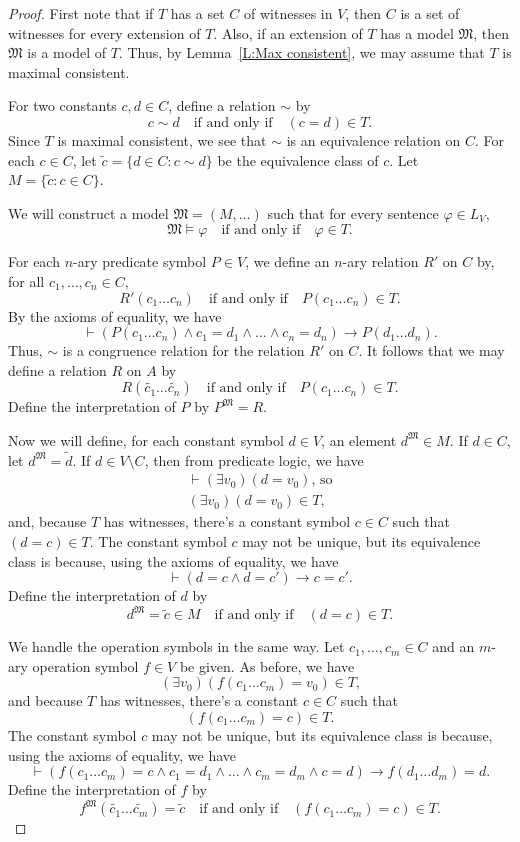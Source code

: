 \documentclass{scrartcl}
\renewcommand{\phi}{\varphi}
\newcommand{\FM}{\mathfrak{M}}
\begin{document}
\begin{proof}
First note that if $T$ has a set $C$ of witnesses in $V$, then $C$ is a set of witnesses for every extension of $T$. Also, if an extension of $T$ has a model $\FM$, then $\FM$ is a model of $T$. Thus, by Lemma~\ref{L:Max consistent}, we may assume that $T$ is maximal consistent.

For two constants $c,d\in C$, define a relation $\sim$ by 
\[
c\sim d \quad \text{if and only if} \quad (c=d)\in T\text{.}
\]
Since $T$ is maximal consistent, we see that $\sim$ is an equivalence relation on $C$. For each $c\in C$, let $\tilde{c} = \{ d\in C\colon c\sim d\}$ be the equivalence class of $c$. Let 
$M = \{\tilde{c}:c\in C\}$.

We will construct a model $\FM = (M,\dots)$ such that for every sentence $\phi\in L_V$, 
\[
\FM \models \phi \quad \text{if and only if} \quad \phi\in T\text{.}
\]

For each $n$-ary predicate symbol $P\in V$, we define an $n$-ary relation $R'$ on $C$ by, for all $c_1,\dots, c_n\in C$, 
\[
R'(c_1 \dots c_n)\quad \text{if and only if} \quad P(c_1\dots c_n)\in T\text{.}
\]
By the axioms of equality, we have 
\[
\vdash (P(c_1\dots c_n)\wedge c_1 = d_1 \wedge \dots \wedge c_n = d_n) \rightarrow P(d_1\dots d_n)\text{.}
\]
Thus, $\sim$ is a congruence relation for the relation $R'$ on $C$. It follows that we may define a relation $R$ on $A$ by 
\[
R(\tilde{c_1}\dots \tilde{c_n})\quad \text{if and only if}\quad P(c_1\dots c_n)\in T\text{.}
\]
Define the interpretation of $P$ by $P^\FM = R$.

Now we will define, for each constant symbol $d\in V$, an element $d^{\FM}\in M$. If $d\in C$, let $d^\FM = \tilde{d}$. If $d\in V\setminus C$, then from predicate logic, we have
\begin{align*}
\vdash (\exists v_0)(d=v_0)\text{, so}\\
(\exists v_0)(d=v_0)\in T\text{,}
\end{align*}
and, because $T$ has witnesses, there's a constant symbol $c\in C$ such that $(d=c)\in T$.
The constant symbol $c$ may not be unique, but its equivalence class is because, using the axioms of equality, we have 
\[
\vdash (d=c\wedge d=c')\rightarrow c=c'\text{.}
\]
Define the interpretation of $d$ by 
\[ d^\FM = \tilde{c}\in M\quad \text{if and only if}\quad(d=c)\in T \text{.}
\]

We handle the operation symbols in the same way. Let $c_1,\dots, c_m\in C$ and an $m$-ary operation symbol $f\in V$ be given. As before, we have \[
(\exists v_0)(f(c_1\dots c_m)=v_0)\in T\text{,}
\]
and because $T$ has witnesses, there's a constant $c\in C$ such that 
\[
(f(c_1\dots c_m) = c)\in T\text{.}
\]
The constant symbol $c$ may not be unique, but its equivalence class is because, using the axioms of equality, we have 
\[
\vdash (f(c_1\dots c_m) = c\wedge c_1 = d_1\wedge \dots \wedge c_m = d_m \wedge c=d)\rightarrow f(d_1\dots d_m) = d\text{.}
\]
Define the interpretation of $f$ by 
\[
f^\FM (\tilde{c_1}\dots \tilde{c_m})=\tilde{c} \quad \text{if and only if} \quad (f(c_1\dots c_m)=c)\in T\text{.}
\]


\end{proof}
\end{document}
